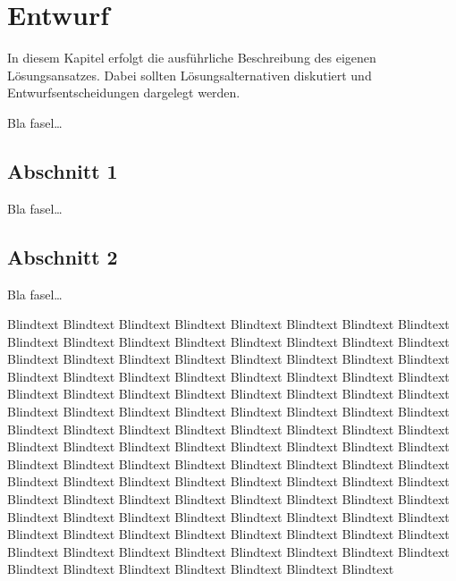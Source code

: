 
\chapter{Entwurf}
\label{ch:Entwurf}
In diesem Kapitel erfolgt die ausführliche Beschreibung des eigenen
Lösungsansatzes. Dabei sollten Lösungsalternativen diskutiert und
Entwurfsentscheidungen dargelegt werden.


Bla fasel\ldots

\section{Abschnitt 1}
\label{ch:Entwurf:sec:Abschnitt1}

Bla fasel\ldots




\section{Abschnitt 2}
\label{ch:Entwurf:sec:Abschnitt2}

Bla fasel\ldots


Blindtext Blindtext Blindtext Blindtext Blindtext Blindtext Blindtext
Blindtext Blindtext Blindtext Blindtext Blindtext Blindtext Blindtext
Blindtext Blindtext Blindtext Blindtext Blindtext Blindtext Blindtext
Blindtext Blindtext Blindtext Blindtext Blindtext Blindtext Blindtext
Blindtext Blindtext Blindtext Blindtext Blindtext Blindtext Blindtext
Blindtext Blindtext Blindtext Blindtext Blindtext Blindtext Blindtext
Blindtext Blindtext Blindtext Blindtext Blindtext Blindtext Blindtext
Blindtext Blindtext Blindtext Blindtext Blindtext Blindtext Blindtext
Blindtext Blindtext Blindtext Blindtext Blindtext Blindtext Blindtext
Blindtext Blindtext Blindtext Blindtext Blindtext Blindtext Blindtext
Blindtext Blindtext Blindtext Blindtext Blindtext Blindtext Blindtext
Blindtext Blindtext Blindtext Blindtext Blindtext Blindtext Blindtext
Blindtext Blindtext Blindtext Blindtext Blindtext Blindtext Blindtext
Blindtext Blindtext Blindtext Blindtext Blindtext Blindtext Blindtext
Blindtext Blindtext Blindtext Blindtext Blindtext Blindtext Blindtext
Blindtext Blindtext Blindtext Blindtext Blindtext Blindtext Blindtext
Blindtext Blindtext Blindtext Blindtext Blindtext Blindtext Blindtext


